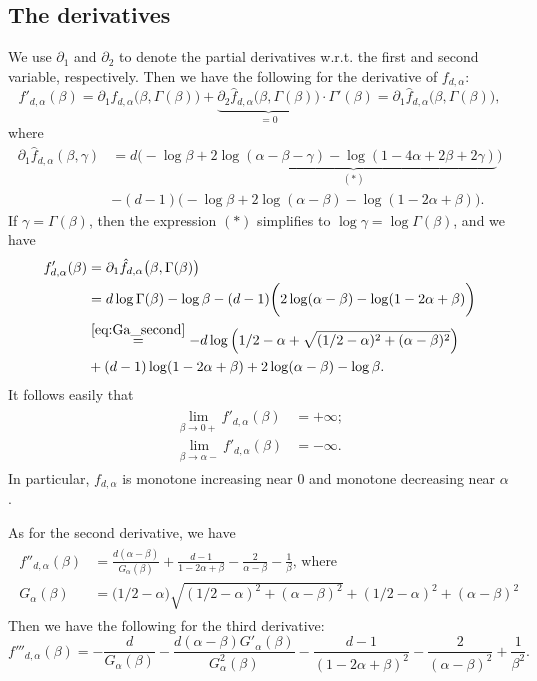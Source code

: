 \documentclass[12pt]{amsart}
\theoremstyle{definition}
\newcommand\fhat{\hat{f}}
\newcommand\al{\alpha}
\newcommand\be{\beta}
\newcommand\ga{\gamma}
\newcommand\Ga{\Gamma}
\begin{document}
\subsection{The derivatives} \label{sec:derivatives}
%
We use $\partial_1$ and $\partial_2$ to denote the partial derivatives w.r.t. the first and second variable, respectively. Then we have the following for the derivative of $f_{d,\al}$:
%
\[ f'_{d,\al}(\be) 
= \partial_1 \fhat_{d,\al} 
\big( \be, \Ga(\be) \big) 
+ \underbrace{\partial_2 \fhat_{d,\al} 
\big( \be, \Ga(\be) \big)}_{=0} 
\cdot \Ga'(\be) 
= \partial_1 \fhat_{d,\al} 
\big( \be, \Ga(\be) \big)  ,\]
%
where 
%
\begin{align*}
\partial_1 \fhat_{d,\al} (\be,\ga)
&= d \bigg( -\log \be + 
\underbrace{2 \log(\al-\be-\ga) 
- \log(1-4\al+2\be+2\ga)}_{(\ast)} \bigg) \\
&- (d-1) \bigg( -\log \be + 2 \log(\al-\be)-\log(1-2\al+\be) \bigg) .
\end{align*}  
%
If $\ga=\Ga(\be)$, then the expression $(\ast)$ simplifies to $\log \ga = \log \Ga(\be)$, and we have 
%
\begin{align} 
\begin{split} \label{eq:f_der}
f'_{d,\al}(\be) 
&= \partial_1 \fhat_{d,\al} 
\big( \be, \Ga(\be) \big) \\
&= d \log \Ga(\be) - \log \be 
- (d-1) \bigg( 2 \log(\al-\be)-\log(1-2\al+\be) \bigg) \\
& \stackrel{\eqref{eq:Ga_second}}{=} -d \log\left( 1/2-\al 
+\sqrt{(1/2-\al)^2+(\al-\be)^2} \right) \\
&+ (d-1)\log(1-2\al+\be)
+2\log(\al-\be) 
-\log \be .
\end{split}
\end{align}
%
It follows easily that  
%
\begin{align}
\begin{split} 
\lim_{\be \to 0+} f'_{d,\al}(\be) &= +\infty ; \\
\lim_{\be \to \al-} f'_{d,\al}(\be) &= -\infty .
\label{eq:endpoint_der}
\end{split}
\end{align}
%
In particular, $f_{d,\al}$ is monotone increasing near $0$ and monotone decreasing near $\al$.

As for the second derivative, we have  
%
\begin{align} 
\begin{split} \label{eq:f_derder}
f''_{d,\al}(\be) 
&= \frac{d(\al-\be)}{G_\al(\be)} 
+ \frac{d-1}{1-2\al+\be}
-\frac{2}{\al-\be} 
-\frac{1}{\be} \text{, where} \\
G_\al(\be) &= \big( 1/2-\al \big) 
\sqrt{(1/2-\al)^2+(\al-\be)^2} 
+(1/2-\al)^2+(\al-\be)^2
\end{split}
\end{align}
%
Then we have the following for the third derivative:
%
\begin{equation} \label{eq:f_derderder}
f'''_{d,\al}(\be) = 
- \frac{d}{G_\al(\be)} 
- \frac{d(\al-\be) G'_\al(\be)}{G^2_\al(\be)} 
- \frac{d-1}{(1-2\al+\be)^2}
- \frac{2}{(\al-\be)^2}
+ \frac 1 {\be^2} .
\end{equation}
%
\end{document}
